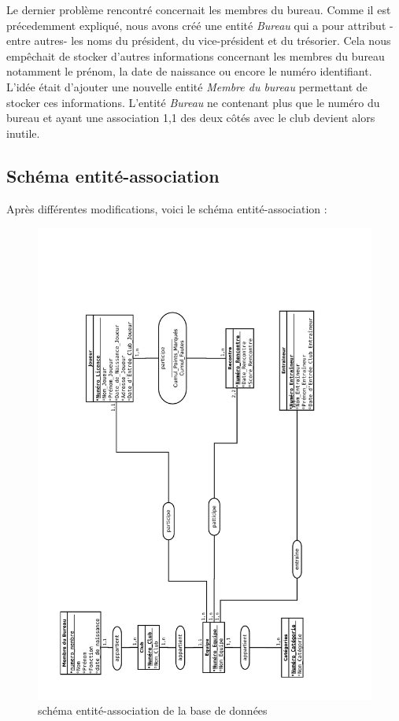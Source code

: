 \documentclass{article}
\begin{document}
Le dernier problème rencontré concernait les membres du bureau. Comme il est précedemment expliqué, nous avons créé une entité \textit{Bureau} qui a pour attribut -entre autres- les noms du président, du vice-président et du trésorier. Cela nous empêchait de stocker d'autres informations concernant les membres du bureau notamment le prénom, la date de naissance ou encore le numéro identifiant. L'idée était d'ajouter une nouvelle entité \textit{Membre du bureau} permettant de stocker ces informations. L'entité \textit{Bureau} ne contenant plus que le numéro du bureau et ayant une association 1,1 des deux côtés avec le club devient alors inutile.  


\newpage

\subsection{Schéma entité-association }
Après différentes modifications, voici le schéma entité-association :
 
\begin{figure}[h!]
\centering
\includegraphics[scale=0.35 , angle = -90]{BasketBall_EA.pdf}
\caption{schéma entité-association de la base de données}
\end{figure}
\end{document}

